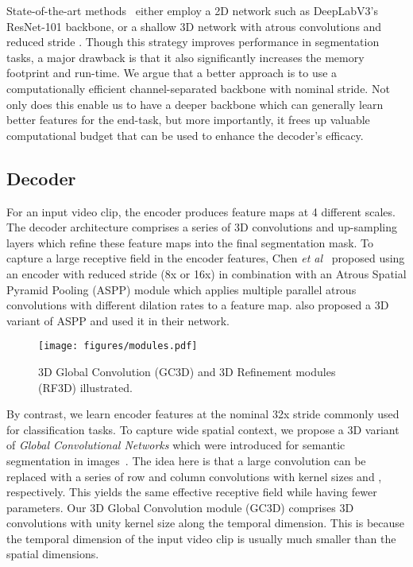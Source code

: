 \documentclass{bmvc2k_arxiv}
\makeatletter
\newcommand*{\etal}{\emph{et al.}\@\xspace}
\def\etal{\emph{et al}\bmvaOneDot}
\makeatother
\begin{document}
State-of-the-art methods~\cite{Yang19ICCVAnchorDiff,Wang19ICCV} either employ a 2D network such as DeepLabV3's~\cite{Chen17ARXIV} ResNet-101 backbone, or a shallow 3D network with atrous convolutions and reduced stride \cite{Hou19BMVC}. Though this strategy improves performance in segmentation tasks, a major drawback is that it also significantly increases the memory footprint and run-time. We argue that a better approach is to use a computationally efficient channel-separated backbone with nominal stride. Not only does this enable us to have a deeper backbone which can generally learn better features for the end-task, but more importantly, it frees up valuable computational budget that can be used to enhance the decoder's efficacy.



\subsection{Decoder}
\label{sec:decoder}

For an input video clip, the encoder produces feature maps at 4 different scales. The decoder architecture comprises a series of 3D convolutions and up-sampling layers which refine these feature maps into the final segmentation mask. 
To capture a large receptive field in the encoder features, Chen \etal~\cite{Chen2018ECCV} proposed using an encoder with reduced stride (8x or 16x) in combination with an Atrous Spatial Pyramid Pooling (ASPP) module which applies multiple parallel atrous convolutions with different dilation rates to a feature map. \cite{Hou19BMVC} also proposed a 3D variant of ASPP and used it in their network. 

\begin{wrapfigure}[18]{r}{0.5\textwidth}
\centering
    \texttt{[image: figures/modules.pdf]}
    \caption{3D Global Convolution (GC3D) and 3D Refinement modules (RF3D) illustrated.}
    \label{fig:modules}
\vspace{-3mm}
\end{wrapfigure}
By contrast, we learn encoder features at the nominal 32x stride commonly used for classification tasks.
To capture wide spatial context, we propose a 3D variant of \textit{Global Convolutional Networks} which were introduced for semantic segmentation in images~\cite{Peng17CVPR}.
The idea here is that a large  convolution can be replaced with a series of row and column convolutions with kernel sizes  and , respectively. This yields the same effective receptive field while having fewer parameters. 
Our 3D Global Convolution module (GC3D) comprises 3D convolutions with unity kernel size along the temporal dimension. This is because the temporal dimension of the input video clip is usually much smaller than the spatial dimensions.
\end{document}
